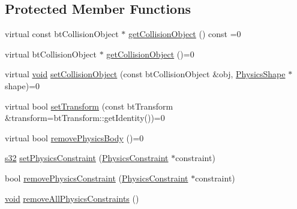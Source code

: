 \subsection*{Protected Member Functions}
\begin{DoxyCompactItemize}
\item 
virtual const bt\+Collision\+Object $\ast$ \mbox{\hyperlink{classnjli_1_1_physics_body_a48031c76bbe2bd9c4540d6d27b8b42bb}{get\+Collision\+Object}} () const =0
\item 
virtual bt\+Collision\+Object $\ast$ \mbox{\hyperlink{classnjli_1_1_physics_body_ad3edabf71cfde91351bb428c9f06931e}{get\+Collision\+Object}} ()=0
\item 
virtual \mbox{\hyperlink{_thread_8h_af1e856da2e658414cb2456cb6f7ebc66}{void}} \mbox{\hyperlink{classnjli_1_1_physics_body_a674974f0df3db645620c7156177659ee}{set\+Collision\+Object}} (const bt\+Collision\+Object \&obj, \mbox{\hyperlink{classnjli_1_1_physics_shape}{Physics\+Shape}} $\ast$shape)=0
\item 
virtual bool \mbox{\hyperlink{classnjli_1_1_physics_body_aa2859a8335e3c38ff71b12bc0b002b0e}{set\+Transform}} (const bt\+Transform \&transform=bt\+Transform\+::get\+Identity())=0
\item 
virtual bool \mbox{\hyperlink{classnjli_1_1_physics_body_a832ed4f79a2b52b334d63d094364f86a}{remove\+Physics\+Body}} ()=0
\item 
\mbox{\hyperlink{_util_8h_aa62c75d314a0d1f37f79c4b73b2292e2}{s32}} \mbox{\hyperlink{classnjli_1_1_physics_body_a144a0d79efe85c3c64da84d28e880768}{set\+Physics\+Constraint}} (\mbox{\hyperlink{classnjli_1_1_physics_constraint}{Physics\+Constraint}} $\ast$constraint)
\item 
bool \mbox{\hyperlink{classnjli_1_1_physics_body_a45058a03979e89b0b0fc4dceb07d8b4d}{remove\+Physics\+Constraint}} (\mbox{\hyperlink{classnjli_1_1_physics_constraint}{Physics\+Constraint}} $\ast$constraint)
\item 
\mbox{\hyperlink{_thread_8h_af1e856da2e658414cb2456cb6f7ebc66}{void}} \mbox{\hyperlink{classnjli_1_1_physics_body_ae4a8cca611e33c624b287613eac4d72c}{remove\+All\+Physics\+Constraints}} ()
\end{DoxyCompactItemize}
